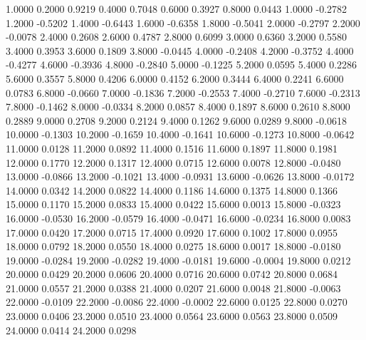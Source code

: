     1.0000
    0.2000    0.9219
    0.4000    0.7048
    0.6000    0.3927
    0.8000    0.0443
    1.0000   -0.2782
    1.2000   -0.5202
    1.4000   -0.6443
    1.6000   -0.6358
    1.8000   -0.5041
    2.0000   -0.2797
    2.2000   -0.0078
    2.4000    0.2608
    2.6000    0.4787
    2.8000    0.6099
    3.0000    0.6360
    3.2000    0.5580
    3.4000    0.3953
    3.6000    0.1809
    3.8000   -0.0445
    4.0000   -0.2408
    4.2000   -0.3752
    4.4000   -0.4277
    4.6000   -0.3936
    4.8000   -0.2840
    5.0000   -0.1225
    5.2000    0.0595
    5.4000    0.2286
    5.6000    0.3557
    5.8000    0.4206
    6.0000    0.4152
    6.2000    0.3444
    6.4000    0.2241
    6.6000    0.0783
    6.8000   -0.0660
    7.0000   -0.1836
    7.2000   -0.2553
    7.4000   -0.2710
    7.6000   -0.2313
    7.8000   -0.1462
    8.0000   -0.0334
    8.2000    0.0857
    8.4000    0.1897
    8.6000    0.2610
    8.8000    0.2889
    9.0000    0.2708
    9.2000    0.2124
    9.4000    0.1262
    9.6000    0.0289
    9.8000   -0.0618
   10.0000   -0.1303
   10.2000   -0.1659
   10.4000   -0.1641
   10.6000   -0.1273
   10.8000   -0.0642
   11.0000    0.0128
   11.2000    0.0892
   11.4000    0.1516
   11.6000    0.1897
   11.8000    0.1981
   12.0000    0.1770
   12.2000    0.1317
   12.4000    0.0715
   12.6000    0.0078
   12.8000   -0.0480
   13.0000   -0.0866
   13.2000   -0.1021
   13.4000   -0.0931
   13.6000   -0.0626
   13.8000   -0.0172
   14.0000    0.0342
   14.2000    0.0822
   14.4000    0.1186
   14.6000    0.1375
   14.8000    0.1366
   15.0000    0.1170
   15.2000    0.0833
   15.4000    0.0422
   15.6000    0.0013
   15.8000   -0.0323
   16.0000   -0.0530
   16.2000   -0.0579
   16.4000   -0.0471
   16.6000   -0.0234
   16.8000    0.0083
   17.0000    0.0420
   17.2000    0.0715
   17.4000    0.0920
   17.6000    0.1002
   17.8000    0.0955
   18.0000    0.0792
   18.2000    0.0550
   18.4000    0.0275
   18.6000    0.0017
   18.8000   -0.0180
   19.0000   -0.0284
   19.2000   -0.0282
   19.4000   -0.0181
   19.6000   -0.0004
   19.8000    0.0212
   20.0000    0.0429
   20.2000    0.0606
   20.4000    0.0716
   20.6000    0.0742
   20.8000    0.0684
   21.0000    0.0557
   21.2000    0.0388
   21.4000    0.0207
   21.6000    0.0048
   21.8000   -0.0063
   22.0000   -0.0109
   22.2000   -0.0086
   22.4000   -0.0002
   22.6000    0.0125
   22.8000    0.0270
   23.0000    0.0406
   23.2000    0.0510
   23.4000    0.0564
   23.6000    0.0563
   23.8000    0.0509
   24.0000    0.0414
   24.2000    0.0298
